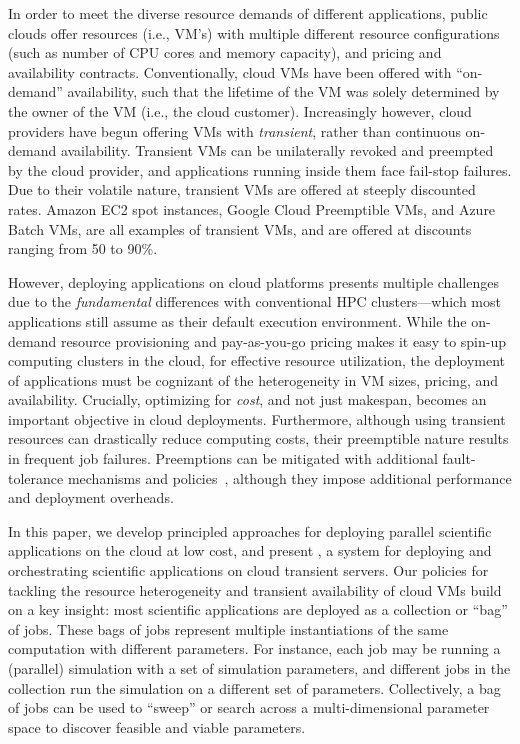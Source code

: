 
In order to meet the diverse resource demands of different applications, public clouds offer resources (i.e., VM's) with multiple different resource configurations (such as number of CPU cores and memory capacity), and pricing and availability contracts. 
Conventionally, cloud VMs have been offered with ``on-demand'' availability, such that the lifetime of the VM was solely determined by the owner of the VM (i.e., the cloud customer). 
Increasingly however, cloud providers have begun offering VMs with \emph{transient}, rather than continuous on-demand availability. 
Transient VMs can be unilaterally revoked and preempted by the cloud provider, and applications running inside them face fail-stop failures. 
Due to their volatile nature, transient VMs are offered at steeply discounted rates. Amazon EC2 spot instances, Google Cloud Preemptible VMs, and Azure Batch VMs, are all examples of transient VMs, and are offered at discounts ranging from 50 to 90\%.  


However, deploying applications on cloud platforms presents multiple challenges due to the  \emph{fundamental} differences with conventional HPC clusters---which most applications still assume as their default execution environment. 
%
While the on-demand resource provisioning and pay-as-you-go pricing makes it easy to spin-up computing clusters in the cloud, for effective resource utilization, the deployment of applications must be cognizant of the heterogeneity in VM sizes, pricing, and availability.
%
Crucially, optimizing for \emph{cost}, and not just makespan, becomes an important objective in cloud deployments. 
% 
Furthermore, although using transient resources can drastically reduce computing costs, their preemptible nature results in frequent job failures.
%
Preemptions can be mitigated with additional fault-tolerance mechanisms and policies~\cite{flint, marathe2014exploiting}, although they impose additional performance and deployment overheads. 



In this paper, we develop principled approaches for deploying parallel scientific applications on the cloud at low cost, and present \sysname, a system for deploying and orchestrating scientific applications on cloud transient servers. 
%
%
Our policies for tackling the resource heterogeneity and transient availability of cloud VMs build on a key insight: most scientific applications are deployed as a collection or ``bag'' of jobs. 
%
These bags of jobs represent multiple instantiations of the same computation with different parameters. 
%
For instance, each job may be running a (parallel) simulation with a set of simulation parameters, and different jobs in the collection run the simulation on a different set of parameters. 
Collectively, a bag of jobs can be used to ``sweep'' or search across a multi-dimensional parameter space to discover feasible and viable parameters.



